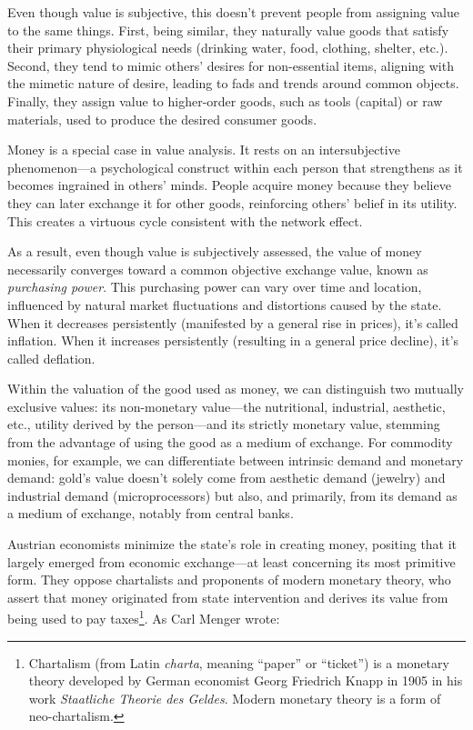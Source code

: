 \documentclass[
  a5paper,
  smalldemyvopaper,10pt,twoside,onecolumn,openright,extrafontsizes,hidelinks]{memoir}
\begin{document}
Even though value is subjective, this doesn't prevent people from
assigning value to the same things. First, being similar, they naturally
value goods that satisfy their primary physiological needs (drinking
water, food, clothing, shelter, etc.). Second, they tend to mimic
others' desires for non-essential items, aligning with the mimetic
nature of desire, leading to fads and trends around common objects.
Finally, they assign value to higher-order goods, such as tools
(capital) or raw materials, used to produce the desired consumer goods.

Money is a special case in value analysis. It rests on an
intersubjective phenomenon---a psychological construct within each
person that strengthens as it becomes ingrained in others' minds. People
acquire money because they believe they can later exchange it for other
goods, reinforcing others' belief in its utility. This creates a
virtuous cycle consistent with the network effect.

As a result, even though value is subjectively assessed, the value of
money necessarily converges toward a common objective exchange value,
known as \emph{purchasing power}. This purchasing power can vary over
time and location, influenced by natural market fluctuations and
distortions caused by the state. When it decreases persistently
(manifested by a general rise in prices), it's called inflation. When it
increases persistently (resulting in a general price decline), it's
called deflation.

Within the valuation of the good used as money, we can distinguish two
mutually exclusive values: its non-monetary value---the nutritional,
industrial, aesthetic, etc., utility derived by the person---and its
strictly monetary value, stemming from the advantage of using the good
as a medium of exchange. For commodity monies, for example, we can
differentiate between intrinsic demand and monetary demand: gold's value
doesn't solely come from aesthetic demand (jewelry) and industrial
demand (microprocessors) but also, and primarily, from its demand as a
medium of exchange, notably from central banks.

Austrian economists minimize the state's role in creating money,
positing that it largely emerged from economic exchange---at least
concerning its most primitive form. They oppose chartalists and
proponents of modern monetary theory, who assert that money originated
from state intervention and derives its value from being used to pay
taxes\footnote{Chartalism (from Latin \emph{charta}, meaning ``paper''
  or ``ticket'') is a monetary theory developed by German economist
  Georg Friedrich Knapp in 1905 in his work \emph{Staatliche Theorie des
  Geldes}. Modern monetary theory is a form of neo-chartalism.}. As Carl
Menger wrote:
\end{document}
